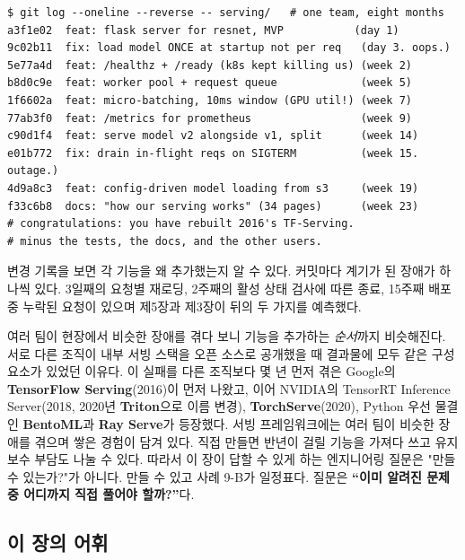 \begin{terminalbox}
\begin{Verbatim}[breaklines=true,breakanywhere=true,fontsize=\small,formatcom=\color{tbbtermfg},codes=\tbbcodeactive]
$ git log --oneline --reverse -- serving/   # one team, eight months
a3f1e02  feat: flask server for resnet, MVP           (day 1)
9c02b11  fix: load model ONCE at startup not per req   (day 3. oops.)
5e77a4d  feat: /healthz + /ready (k8s kept killing us) (week 2)
b8d0c9e  feat: worker pool + request queue             (week 5)
1f6602a  feat: micro-batching, 10ms window (GPU util!) (week 7)
77ab3f0  feat: /metrics for prometheus                 (week 9)
c90d1f4  feat: serve model v2 alongside v1, split      (week 14)
e01b772  fix: drain in-flight reqs on SIGTERM          (week 15. outage.)
4d9a8c3  feat: config-driven model loading from s3     (week 19)
f33c6b8  docs: "how our serving works" (34 pages)      (week 23)
# congratulations: you have rebuilt 2016's TF-Serving.
# minus the tests, the docs, and the other users.
\end{Verbatim}
\end{terminalbox}

변경 기록을 보면 각 기능을 왜 추가했는지 알 수 있다. 커밋마다 계기가 된 장애가 하나씩 있다. 3일째의 요청별 재로딩, 2주째의 활성 상태 검사에 따른 종료, 15주째 배포 중 누락된 요청이 있으며 제5장과 제3장이 뒤의 두 가지를 예측했다.

여러 팀이 현장에서 비슷한 장애를 겪다 보니 기능을 추가하는 \textit{순서}까지 비슷해진다. 서로 다른 조직이 내부 서빙 스택을 오픈 소스로 공개했을 때 결과물에 모두 같은 구성 요소가 있었던 이유다. 이 실패를 다른 조직보다 몇 년 먼저 겪은 Google의 \textbf{TensorFlow Serving}(2016)이 먼저 나왔고, 이어 NVIDIA의 TensorRT Inference Server(2018, 2020년 \textbf{Triton}으로 이름 변경), \textbf{TorchServe}(2020), Python 우선 물결인 \textbf{BentoML}과 \textbf{Ray Serve}가 등장했다. 서빙 프레임워크에는 여러 팀이 비슷한 장애를 겪으며 쌓은 경험이 담겨 있다. 직접 만들면 반년이 걸릴 기능을 가져다 쓰고 유지보수 부담도 나눌 수 있다. 따라서 이 장이 답할 수 있게 하는 엔지니어링 질문은 "만들 수 있는가?"가 아니다. 만들 수 있고 사례 9-B가 일정표다. 질문은 \textbf{“이미 알려진 문제 중 어디까지 직접 풀어야 할까?”}다.

\subsection*{이 장의 어휘}

